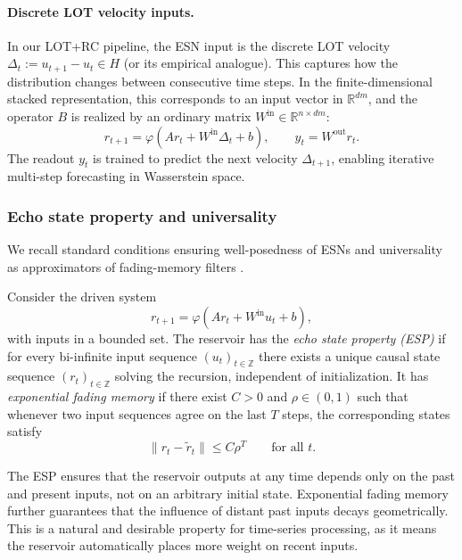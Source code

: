 \documentclass[11pt]{article}
\newcommand{\R}{\mathbb{R}}
\newcommand{\1}{\mathbf{1}}
\begin{document}
\paragraph{Discrete LOT velocity inputs.} In our LOT+RC pipeline, the ESN input is the discrete LOT velocity $\Delta_t:=u_{t+1}-u_t\in H$ (or its empirical analogue). This captures how the distribution changes between consecutive time steps. In the finite-dimensional stacked representation, this corresponds to an input vector in $\R^{dm}$, and the operator $B$ is realized by an ordinary matrix $W^{\mathrm{in}}\in\R^{n\times dm}$:
\begin{equation}\label{eq:rc-update-discrete-prelim}
r_{t+1}=\varphi(A r_t + W^{\mathrm{in}}\Delta_t + b),\qquad y_t=W^{\mathrm{out}}r_t.
\end{equation}
The readout $y_t$ is trained to predict the next velocity $\Delta_{t+1}$, enabling iterative multi-step forecasting in Wasserstein space.


\subsubsection*{Echo state property and universality}\label{sec:prelim-esp}

We recall standard conditions ensuring well-posedness of ESNs and universality as
approximators of fading-memory filters \cite{jaeger2001echo,GrigoryevaOrtega2018,GononOrtega2020}.

\begin{definition}\label{def:esp}
Consider the driven system
\[
r_{t+1}=\varphi(A r_t + W^{\mathrm{in}} u_t + b),
\]
with inputs in a bounded set.
The reservoir has the \emph{echo state property (ESP)} if for every bi-infinite input
sequence $(u_t)_{t\in\mathbb Z}$ there exists a unique causal state sequence
$(r_t)_{t\in\mathbb Z}$ solving the recursion, independent of initialization.
It has \emph{exponential fading memory} if there exist $C>0$ and $\rho\in(0,1)$ such that
whenever two input sequences agree on the last $T$ steps, the corresponding states satisfy
\[
\|r_t-\tilde r_t\|\le C\rho^T\qquad\text{for all }t.
\]
\end{definition}

The ESP ensures that the reservoir outputs at any time depends only on the past and present inputs, not on an arbitrary initial state. Exponential fading memory further guarantees that the influence of distant past inputs decays geometrically. This is a natural and desirable property for time-series processing, as it means the reservoir automatically places more weight on recent inputs. \\
\end{document}

